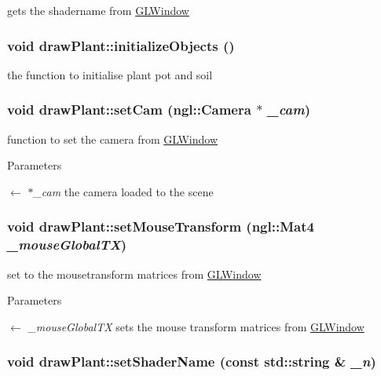 gets the shadername from \hyperlink{classGLWindow}{GLWindow} \hypertarget{classdrawPlant_ad3334e617ca49c38e033f08ecd7d4421}{
\subsubsection[{initializeObjects}]{\setlength{\rightskip}{0pt plus 5cm}void drawPlant::initializeObjects ()}}
\label{classdrawPlant_ad3334e617ca49c38e033f08ecd7d4421}


the function to initialise plant pot and soil \hypertarget{classdrawPlant_a0be5be0576dc4f79fad43d200f30c06e}{
\subsubsection[{setCam}]{\setlength{\rightskip}{0pt plus 5cm}void drawPlant::setCam (ngl::Camera $\ast$ {\em \_\-cam})}}
\label{classdrawPlant_a0be5be0576dc4f79fad43d200f30c06e}


function to set the camera from \hyperlink{classGLWindow}{GLWindow} 
\begin{DoxyParams}{Parameters}
\item[\mbox{$\leftarrow$} {\em $\ast$\_\-cam}]the camera loaded to the scene \end{DoxyParams}
\hypertarget{classdrawPlant_a823c40b052df2f569e1792990b99be53}{
\subsubsection[{setMouseTransform}]{\setlength{\rightskip}{0pt plus 5cm}void drawPlant::setMouseTransform (ngl::Mat4 {\em \_\-mouseGlobalTX})}}
\label{classdrawPlant_a823c40b052df2f569e1792990b99be53}


set to the mousetransform matrices from \hyperlink{classGLWindow}{GLWindow} 
\begin{DoxyParams}{Parameters}
\item[\mbox{$\leftarrow$} {\em \_\-mouseGlobalTX}]sets the mouse transform matrices from \hyperlink{classGLWindow}{GLWindow} \end{DoxyParams}
\hypertarget{classdrawPlant_a94a690f884d9c8694d339fc593b6ec05}{
\subsubsection[{setShaderName}]{\setlength{\rightskip}{0pt plus 5cm}void drawPlant::setShaderName (const std::string \& {\em \_\-n})}}
\label{classdrawPlant_a94a690f884d9c8694d339fc593b6ec05}



